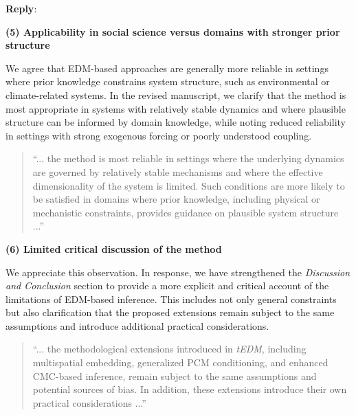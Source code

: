 \documentclass[11pt]{article}
\newenvironment{reply}
   {\medskip \noindent \color{blue} \begin{sf}\textbf{Reply}:\  }
   {\medskip \par \end{sf}}
\begin{document}
\begin{reply}
\vspace{0.5em}

\textbf{(5) Applicability in social science versus domains with stronger prior structure}

We agree that EDM-based approaches are generally more reliable in settings where prior knowledge constrains system structure, such as environmental or climate-related systems. In the revised manuscript, we clarify that the method is most appropriate in systems with relatively stable dynamics and where plausible structure can be informed by domain knowledge, while noting reduced reliability in settings with strong exogenous forcing or poorly understood coupling.

\vspace{0.5em}

\begingroup
\color{red}\itshape
\begin{quote}
``... the method is most reliable in settings where the underlying dynamics are governed by relatively stable mechanisms and where the effective dimensionality of the system is limited. Such conditions are more likely to be satisfied in domains where prior knowledge, including physical or mechanistic constraints, provides guidance on plausible system structure ...''
\end{quote}
\endgroup

\vspace{0.5em}

\textbf{(6) Limited critical discussion of the method}

We appreciate this observation. In response, we have strengthened the \textit{Discussion and Conclusion} section to provide a more explicit and critical account of the limitations of EDM-based inference. This includes not only general constraints but also clarification that the proposed extensions remain subject to the same assumptions and introduce additional practical considerations.

\vspace{0.5em}

\begingroup
\color{red}\itshape
\begin{quote}
``... the methodological extensions introduced in \textit{tEDM}, including multispatial embedding, generalized PCM conditioning, and enhanced CMC-based inference, remain subject to the same assumptions and potential sources of bias. In addition, these extensions introduce their own practical considerations ...''
\end{quote}
\endgroup


\end{reply}
\end{document}
